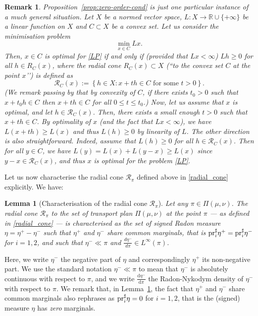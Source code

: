\documentclass[leqno, 11pt, a4paper]{amsart}
\newtheorem{lem}{Lemma}
\newtheorem{rem}{Remark}
\theoremstyle{definition}
\newcommand{\cR}{\mathcal{R}}
\newcommand{\R}{\mathbb{R}}
\newcommand{\pr}{{\rm pr}}
\newcommand{\dd}{\mathrm{d}}
\newcommand{\extendedR}{\R \cup \{+\infty\}}
\begin{document}
\begin{rem}\label{rem:zeroth-order-opt-cond}
	Proposition~\ref{prop:zero-order-cond} is just one particular instance of a much general situation. Let $X$ be a normed vector space, $L : X \to \extendedR$ be a linear function on $X$ and $C \subset X$ be a convex set. Let us consider the minimisation problem
	\begin{equation}\label{LP}
		\min_{x \in C} Lx.
	\end{equation}
	Then, $x \in C$ is optimal for \eqref{LP} if and only if  (provided that $Lx < \infty$) $Lh \geq 0$ for all $h \in R_C(x)$, where the \textit{radial cone} $R_C(x) \subset X$ (``\textit{to the convex set $C$ at the point $x$'}') is defined as
	\begin{equation}\label{eq:radial-cone}
		\cR_C(x) := \left\{h \in X : x + th \in C \text{ for some $t > 0$}\right\}.
	\end{equation}
	(We remark passing by that by convexity of $C$, if there exists $t_0 > 0$ such that $x + t_0 h \in C$ then $x + th \in C$ for all $0 \leq t \leq t_0$.) Now, let us assume that $x$ is optimal, and let $h \in \cR_C(x)$. Then, there exists a small enough $t > 0$ such that $x + th \in C$. By optimality of $x$ (and the fact that $Lx < \infty$), we have $L(x + th) \geq L(x)$ and thus $L(h) \geq 0$ by linearity of $L$. The other direction is also straightforward. Indeed, assume that $L(h) \geq 0$ for all $h \in \cR_C(x)$. Then for all $y \in C$, we have $L(y) = L(x) + L(y -x) \geq L(x)$ since $y-x \in \cR_C(x)$, and thus $x$ is optimal for the problem \eqref{LP}.
\end{rem}

Let us now characterise the radial cone $\cR_\pi$ defined above in \eqref{radial_cone} explicitly. We have:
\begin{lem}[Characterisation of the radial cone $\cR_\pi$]\label{lem:car_r_pi}
	Let any $\pi \in \Pi(\mu, \nu)$. The radial cone $\cR_\pi$ to the set of transport plan $\Pi(\mu, \nu)$ at the point $\pi$ — as defined in \eqref{radial_cone} — is characterised as the set of \emph{signed} Radon measure $\eta = \eta^+ - \eta^-$ such that $\eta^+$ and $\eta^-$ share common marginals, that is $\pr_i^\sharp \eta^+ = \pr_i^\sharp \eta^-$ for $i = 1, 2$, and such that $\eta^- \ll \pi$ and $\frac{d \eta^-}{d \pi} \in L^\infty(\pi)$. 
\end{lem}
Here, we write $\eta^-$  the negative part of $\eta$ and correspondingly $\eta^+$ its non-negative part. We use the standard notation $\eta^- \ll \pi$ to mean that $\eta^-$ is absolutely continuous with respect to $\pi$, and we write $\frac{\dd \eta^-}{\dd \pi}$ the Radon-Nykodym density of $\eta^-$ with respect to $\pi$. We remark that, in Lemma~\ref{lem:car_r_pi}, the fact that $\eta^+$ and $\eta^-$ share common marginals also rephrases as $\pr_i^\sharp \eta =0$ for $i = 1, 2$, that is the (signed) measure $\eta$ has \textit{zero} marginals. 
\end{document}
